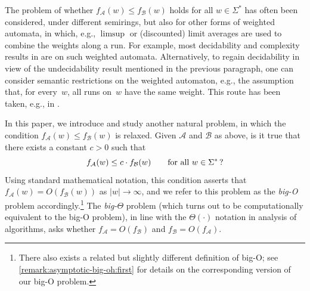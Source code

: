 \documentclass[10pt,a4paper]{amsart}
\numberwithin{equation}{section}
\theoremstyle{plain}
\theoremstyle{definition}
\theoremstyle{remark}
\begin{document}
The problem of whether $f_{\mathcal A}(w) \le f_{\mathcal B}(w)$ holds for all $w \in \Sigma^*$ has often been considered, under different semirings, but also for other forms of weighted automata, in which, e.g., $\limsup$ or (discounted) limit averages are used to combine the weights along a run.
For example, most decidability and complexity results in \cite{ChatterjeeDH10,BansalCV18} are on such weighted automata.
Alternatively, to regain decidability in view of the undecidability result mentioned in the previous paragraph, one can consider semantic restrictions on the weighted automaton, e.g., the assumption that, for every~$w$, all runs on~$w$ have the same weight.
This route has been taken, e.g.,  in \cite{abs-1111-0862}.

In this paper, we introduce and study another natural problem,
in which the condition $f_{\mathcal A}(w) \le f_{\mathcal B}(w)$ 
is relaxed.
Given $\mathcal A$ and $\mathcal B$ as above,
is it true that there exists a constant $c > 0$ such that
\begin{equation*}
f_{\mathcal A}(w) \le c \cdot f_{\mathcal B}(w)
\qquad
\text{for all $w \in \Sigma^*$\,?}
\end{equation*}
Using standard mathematical notation, this condition asserts
that $f_{\mathcal A}(w) = O(f_{\mathcal B}(w))$ as $|w| \to \infty$,
and we refer to this problem as the \emph{big-O} problem accordingly.\footnote{There also exists a related but slightly different definition of big-O;
          see \cref{remark:asymptotic-big-oh:first} for details on the corresponding
          version of our big-O problem.}
The \emph{big-$\Theta$} problem
(which turns out to be computationally equivalent to the big-O problem),
in line with the $\Theta(\cdot)$ notation in analysis of algorithms,
asks whether $f_{\mathcal A} = O(f_{\mathcal B})$ and
$f_{\mathcal B} = O(f_{\mathcal A})$.
\end{document}
